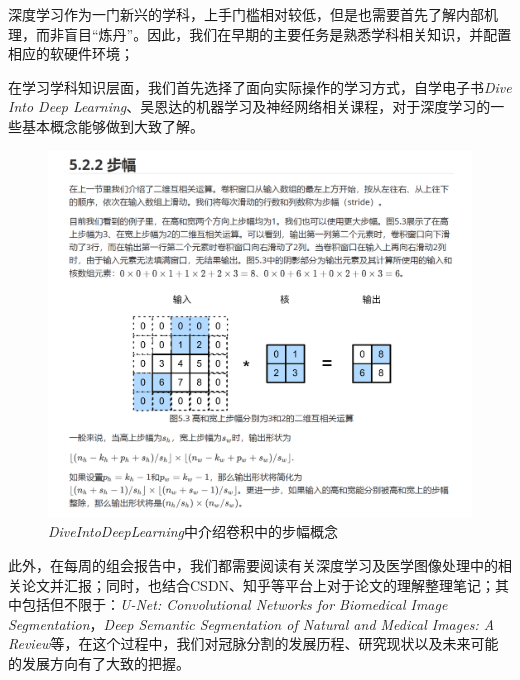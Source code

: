 \documentclass[lang=cn,11pt,a4paper,cite=numbers]{elegantpaper}
\begin{document}
深度学习作为一门新兴的学科，上手门槛相对较低，但是也需要首先了解内部机理，而非盲目“炼丹”。因此，我们在早期的主要任务是熟悉学科相关知识，并配置相应的软硬件环境；

在学习学科知识层面，我们首先选择了面向实际操作的学习方式，自学电子书\emph{Dive Into Deep Learning}、吴恩达的机器学习及神经网络相关课程，对于深度学习的一些基本概念能够做到大致了解。

\begin{figure}[H]
    \centering
    \includegraphics[scale=0.22]{./image/前期总结/DIDL.png}
    \caption{\emph{DiveIntoDeepLearning}中介绍卷积中的步幅概念}
    \label{fig:DIDL}
\end{figure}

此外，在每周的组会报告中，我们都需要阅读有关深度学习及医学图像处理中的相关论文并汇报；同时，也结合CSDN、知乎等平台上对于论文的理解整理笔记；其中包括但不限于：\emph{U-Net: Convolutional Networks for Biomedical Image Segmentation}，\emph{Deep Semantic Segmentation of Natural and Medical Images: A Review}等，在这个过程中，我们对冠脉分割的发展历程、研究现状以及未来可能的发展方向有了大致的把握。
\end{document}
